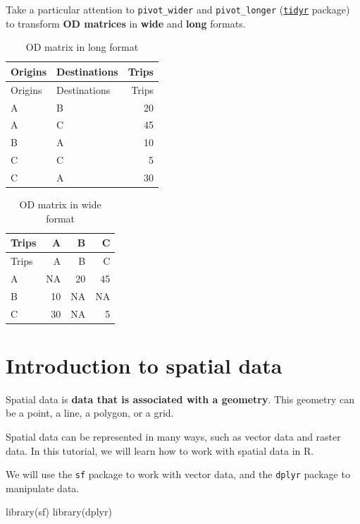 \documentclass[
  letterpaper,
  DIV=11,
  numbers=noendperiod]{scrreprt}
\newenvironment{Shaded}{\begin{snugshade}}{\end{snugshade}}
\newcommand{\FunctionTok}[1]{\textcolor[rgb]{0.28,0.35,0.67}{#1}}
\newcommand{\NormalTok}[1]{\textcolor[rgb]{0.00,0.23,0.31}{#1}}
\begin{document}
Take a particular attention to \texttt{pivot\_wider} and
\texttt{pivot\_longer}
(\href{https://tidyr.tidyverse.org/articles/pivot.html}{\texttt{tidyr}}
package) to transform \textbf{OD matrices} in \textbf{wide} and
\textbf{long} formats.

\begin{longtable}[]{@{}llr@{}}
\caption{OD matrix in long format}\tabularnewline
\toprule\noalign{}
Origins & Destinations & Trips \\
\midrule\noalign{}
\endfirsthead
\toprule\noalign{}
Origins & Destinations & Trips \\
\midrule\noalign{}
\endhead
\bottomrule\noalign{}
\endlastfoot
A & B & 20 \\
A & C & 45 \\
B & A & 10 \\
C & C & 5 \\
C & A & 30 \\
\end{longtable}

\begin{longtable}[]{@{}lrrr@{}}
\caption{OD matrix in wide format}\tabularnewline
\toprule\noalign{}
Trips & A & B & C \\
\midrule\noalign{}
\endfirsthead
\toprule\noalign{}
Trips & A & B & C \\
\midrule\noalign{}
\endhead
\bottomrule\noalign{}
\endlastfoot
A & NA & 20 & 45 \\
B & 10 & NA & NA \\
C & 30 & NA & 5 \\
\end{longtable}

\chapter{Introduction to spatial
data}\label{introduction-to-spatial-data}

Spatial data is \textbf{data that is associated with a geometry}. This
geometry can be a point, a line, a polygon, or a grid.

Spatial data can be represented in many ways, such as vector data and
raster data. In this tutorial, we will learn how to work with spatial
data in R.

We will use the \texttt{sf} package to work with vector data, and the
\texttt{dplyr} package to manipulate data.

\begin{Shaded}
\begin{Highlighting}[]
\FunctionTok{library}\NormalTok{(sf)}
\FunctionTok{library}\NormalTok{(dplyr)}
\end{Highlighting}
\end{Shaded}
\end{document}
